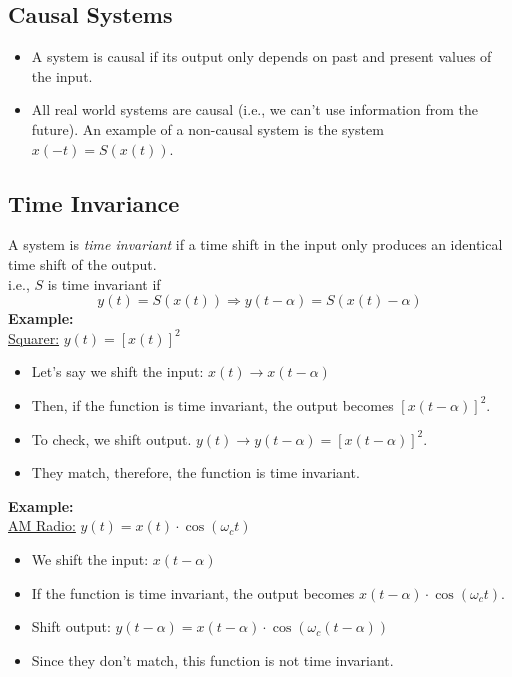 \documentclass[10pt]{article}
\newcommand{\example}{\textbf{Example: }}
\begin{document}
\subsection*{Causal Systems}
\begin{itemize}
    \item A system is causal if its output only depends on past and present values of the input.
    \item All real world systems are causal (i.e., we can't use information from the future).  An example of a non-causal system is the system $x(-t) = S(x(t))$.
\end{itemize}

\subsection*{Time Invariance}
A system is \textit{time invariant} if a time shift in the input only produces an identical time shift of the output.\\
i.e., $S$ is time invariant if
\[y(t) = S(x(t)) \Rightarrow y(t - \alpha) = S(x(t) - \alpha)\]
\example\\
\underline{Squarer:} $y(t) = [x(t)]^2$\\
\begin{itemize}
    \item Let's say we shift the input: $x(t) \rightarrow x(t - \alpha)$
    \item Then, if the function is time invariant, the output becomes $[x(t - \alpha)]^2$.
    \item To check, we shift output.  $y(t) \rightarrow y(t - \alpha) = [x(t - \alpha)]^2$.
    \item They match, therefore, the function is time invariant.
\end{itemize}
\example\\
\underline{AM Radio:} $y(t) = x(t) \cdot \cos(\omega_c t)$
\begin{itemize}
    \item We shift the input: $x(t - \alpha)$
    \item If the function is time invariant, the output becomes $x(t - \alpha) \cdot \cos(\omega_c t)$.
    \item Shift output: $y(t - \alpha) = x(t - \alpha) \cdot \cos(\omega_c (t - \alpha))$
    \item Since they don't match, this function is not time invariant.
\end{itemize}
\end{document}
